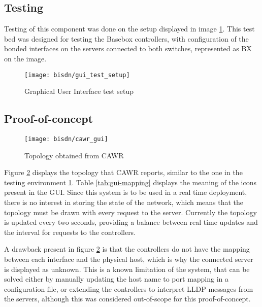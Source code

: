 \subsection{Testing}

\par Testing of this component was done on the setup displayed in image \ref{fig:gui_test_setup}. This test bed was designed for testing the Basebox controllers,
with configuration of the bonded interfaces on the servers connected to both switches, represented as BX on the image.  

\begin{figure}[H]
    \centering
    \texttt{[image: bisdn/gui\_test\_setup]}
    \caption{Graphical User Interface test setup}
    \label{fig:gui_test_setup}
\end{figure}

\subsection{Proof-of-concept}

\begin{figure} [H]
        \centering
        \texttt{[image: bisdn/cawr\_gui]}
        \caption{Topology obtained from CAWR}
        \label{fig:cawr_gui}
\end{figure}

\par Figure \ref{fig:cawr_gui} displays the topology that CAWR reports, similar to the one in the testing environment \ref{fig:gui_test_setup}. Table
\ref{tab:gui-mapping} displays the meaning of the icons present in the GUI. Since this system is to be used in a real time deployment, there is no interest in
storing the state of the network, which means that the topology must be drawn with every request to the server. Currently the topology is updated every two seconds,
providing a balance between real time updates and the interval for requests to the controllers.

\par A drawback present in figure \ref{fig:cawr_gui} is that the controllers do not have the mapping between each interface and the physical host, which is why 
the connected server is displayed as unknown. This is a known limitation of the system, that can be solved either by manually updating the host name to port mapping 
in a configuration file, or extending the controllers to interpret LLDP messages from the servers, although this was considered out-of-scope for this 
proof-of-concept.

